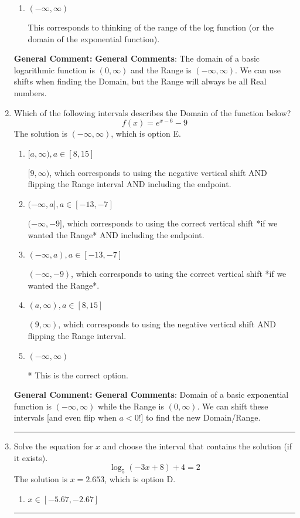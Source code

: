 \documentclass{extbook}[14pt]
\newcommand{\litem}[1]{\item #1

\rule{\textwidth}{0.4pt}}
\begin{document}
\begin{enumerate}
{\begin{enumerate}[label=\Alph*.]
$(-\infty, 1)$, which corresponds to flipping the Domain. Remember: the general for is $a*\log(x-h)+k$, \textbf{where $a$ does not affect the domain}.
\item \( (-\infty, \infty) \)

This corresponds to thinking of the range of the log function (or the domain of the exponential function).
\end{enumerate}

\textbf{General Comment:} \textbf{General Comments}: The domain of a basic logarithmic function is $(0, \infty)$ and the Range is $(-\infty, \infty)$. We can use shifts when finding the Domain, but the Range will always be all Real numbers.
}
\litem{
Which of the following intervals describes the Domain of the function below?
\[ f(x) = e^{x-6}-9 \]The solution is \( (-\infty, \infty) \), which is option E.\begin{enumerate}[label=\Alph*.]
\item \( [a, \infty), a \in [8, 15] \)

$[9, \infty)$, which corresponds to using the negative vertical shift AND flipping the Range interval AND including the endpoint.
\item \( (-\infty, a], a \in [-13, -7] \)

$(-\infty, -9]$, which corresponds to using the correct vertical shift *if we wanted the Range* AND including the endpoint.
\item \( (-\infty, a), a \in [-13, -7] \)

$(-\infty, -9)$, which corresponds to using the correct vertical shift *if we wanted the Range*.
\item \( (a, \infty), a \in [8, 15] \)

$(9, \infty)$, which corresponds to using the negative vertical shift AND flipping the Range interval.
\item \( (-\infty, \infty) \)

* This is the correct option.
\end{enumerate}

\textbf{General Comment:} \textbf{General Comments}: Domain of a basic exponential function is $(-\infty, \infty)$ while the Range is $(0, \infty)$. We can shift these intervals [and even flip when $a<0$!] to find the new Domain/Range.
}
\litem{
Solve the equation for $x$ and choose the interval that contains the solution (if it exists).
\[ \log_{5}{(-3x+8)}+4 = 2 \]The solution is \( x = 2.653 \), which is option D.\begin{enumerate}[label=\Alph*.]
\item \( x \in [-5.67, -2.67] \)


\end{enumerate}}
\end{enumerate}
\end{document}
